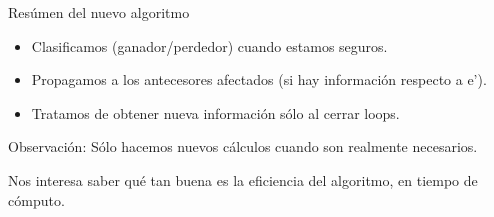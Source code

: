 \begin{frame}{Resúmen del nuevo algoritmo}
    \begin{itemize}
     \item Clasificamos (ganador/perdedor) cuando estamos seguros. %
     \item Propagamos a los antecesores afectados (si hay información respecto a e').
     \item Tratamos de obtener nueva información sólo al cerrar loops.
    \end{itemize}
    
    \begin{block}{Observación:}
        Sólo hacemos nuevos cálculos cuando son realmente necesarios.
    \end{block}
    
    Nos interesa saber qué tan buena es la eficiencia del algoritmo, en tiempo de cómputo.
\end{frame}


